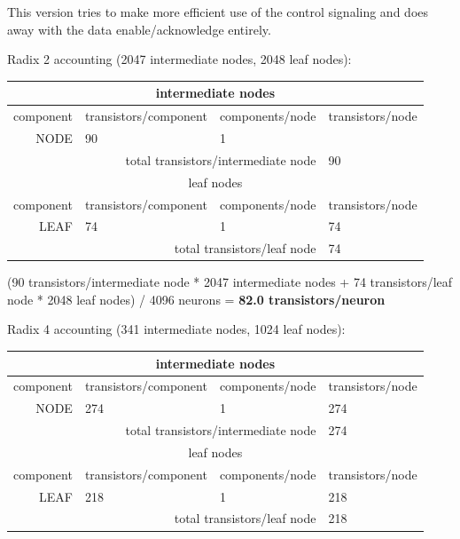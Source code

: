 \documentclass{article}
\begin{document}
This version tries to make more efficient use of the control signaling and does away with the data enable/acknowledge entirely.

\noindent
Radix 2 accounting (2047 intermediate nodes, 2048 leaf nodes):

\begin{center}
    \begin{tabular}{|r|l|l|l|}
    \hline \multicolumn{4}{|c|}{intermediate nodes} \\ \hline
    component & transistors/component & components/node & transistors/node \\ \hline
    NODE & 90 & 1 & \\ \hline
    \hline \multicolumn{3}{|r|}{total transistors/intermediate node} & 90 \\ \hline
    \hline \multicolumn{4}{|c|}{leaf nodes} \\ \hline
    component & transistors/component & components/node & transistors/node \\ \hline
    LEAF & 74 & 1 & 74 \\ \hline
    \hline \multicolumn{3}{|r|}{total transistors/leaf node} & 74 \\ \hline
    \end{tabular}
\end{center}

(90 transistors/intermediate node * 2047 intermediate nodes + 74 transistors/leaf node * 2048 leaf nodes) / 4096 neurons = \textbf{82.0 transistors/neuron}

\noindent
Radix 4 accounting (341 intermediate nodes, 1024 leaf nodes):

\begin{center}
    \begin{tabular}{|r|l|l|l|}
    \hline \multicolumn{4}{|c|}{intermediate nodes} \\ \hline
    component & transistors/component & components/node & transistors/node \\ \hline
    NODE & 274 & 1 & 274 \\ \hline
    \hline \multicolumn{3}{|r|}{total transistors/intermediate node} & 274 \\ \hline
    \hline \multicolumn{4}{|c|}{leaf nodes} \\ \hline
    component & transistors/component & components/node & transistors/node \\ \hline
    LEAF & 218 & 1 & 218 \\ \hline
    \hline \multicolumn{3}{|r|}{total transistors/leaf node} & 218 \\ \hline
    \end{tabular}
\end{center}
\end{document}
